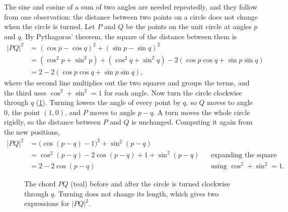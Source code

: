 The sine and cosine of a sum of two angles are needed repeatedly, and they
follow from one observation: the distance between two points on a circle
does not change when the circle is turned. Let $P$ and $Q$ be the points
on the unit circle at angles $p$ and $q$. By Pythagoras' theorem, the
square of the distance between them is
\begin{align*}
   \lvert PQ\rvert^2 &= (\cos p - \cos q)^2 + (\sin p - \sin q)^2\\
   &= (\cos^2 p + \sin^2 p) + (\cos^2 q + \sin^2 q)
      - 2(\cos p\cos q + \sin p\sin q)\\
   &= 2 - 2(\cos p\cos q + \sin p\sin q),
\end{align*}
where the second line multiplies out the two squares and groups the
terms, and the third uses $\cos^2 + \sin^2 = 1$ for each angle.
Now turn the circle clockwise through $q$ (\cref{fig:mo-turn}). Turning
lowers the angle of every point by $q$, so $Q$ moves to angle 0, the point
$(1, 0)$, and $P$ moves to angle $p - q$. A turn moves the whole circle
rigidly, so the distance between $P$ and $Q$ is unchanged. Computing it
again from the new positions,
\begin{align*}
   \lvert PQ\rvert^2 &= \bigl(\cos(p-q) - 1\bigr)^2 + \sin^2(p-q)\\
   &= \cos^2(p-q) - 2\cos(p-q) + 1 + \sin^2(p-q)
      && \text{expanding the square}\\
   &= 2 - 2\cos(p-q)
      && \text{using $\cos^2 + \sin^2 = 1$.}
\end{align*}
\begin{figure}[htb]
\centering
{}
\caption{The chord $PQ$ (teal) before and after the circle is turned
clockwise through $q$. Turning does not change its length, which gives
two expressions for $\lvert PQ\rvert^2$.}
\label{fig:mo-turn}
\end{figure}

